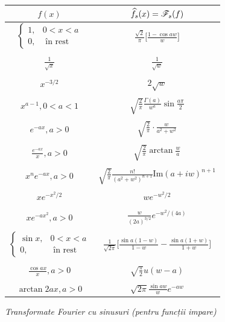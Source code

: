 
\newpage

\begin{figure}[!htbp]
  \centering
  \begin{tabular}{c|c}
    $ f(x) $ & $ \widehat{f}_s(x) = \mathscr{F}_s(f) $ \\
    \hline\hline
    $ \begin{cases} 1, & 0 < x < a \\ 0, & \text{ în rest} \end{cases} $ & $ \frac{\sqrt{2}}{\pi} \Big[ \frac{1 - \cos aw}{w} \Big] $ \\
             & \\
    $ \frac{1}{\sqrt{x}} $ & $ \frac{1}{\sqrt{w}} $ \\
             & \\
    $ x^{-3/2} $ & $ 2 \sqrt{w} $ \\
             & \\
    $  x^{a-1}, 0 < a < 1 $ & $ \sqrt{\frac{2}{\pi}} \frac{\Gamma(a)}{w^a} \sin\frac{a\pi}{2} $ \\
             & \\
    $ e^{-ax}, a > 0 $ & $ \sqrt{\frac{2}{\pi}} \cdot \frac{w}{a^2 + w^2} $ \\
             & \\
    $ \frac{e^{-ax}}{x}, a > 0 $ & $ \sqrt{\frac{2}{\pi}} \arctan \frac{w}{a} $ \\
             & \\
    $ x^n e^{-ax}, a > 0 $ & $ \sqrt{\frac{2}{\pi}} \frac{n!}{(a^2 + w^2)^{n+1}} \mathrm{Im}(a + iw)^{n + 1} $ \\
             & \\
    $ xe^{-x^2/2} $ & $ we^{-w^2/2} $ \\
             & \\
    $ xe^{-ax^2}, a > 0 $ & $ \frac{w}{(2a)^{3/2}} e^{-w^2/(4a)} $ \\
             & \\
    $ \begin{cases} \sin x, & 0 < x < a \\ 0, &\text{ în rest} \end{cases} $ & $ \frac{1}{\sqrt{2\pi}} \Big[ \frac{\sin a(1 - w)}{1 - w} - \frac{\sin a(1 + w)}{1 + w} \Big] $ \\
             & \\
    $ \frac{\cos ax}{x}, a > 0 $ & $ \sqrt{\frac{\pi}{2}} u(w - a) $ \\
             & \\
    $ \arctan{2a}{x}, a > 0 $ & $ \sqrt{2\pi} \frac{\sin aw}{w} e^{-aw} $ 
  \end{tabular}
  \caption{\emph{Transformate Fourier cu sinusuri (pentru funcții impare)}}
\end{figure}

